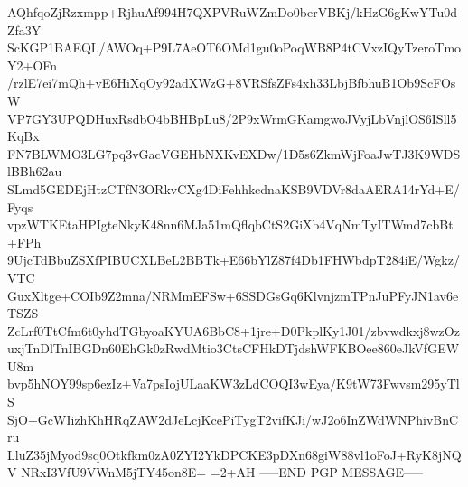 AQhfqoZjRzxmpp+RjhuAf994H7QXPVRuWZmDo0berVBKj/kHzG6gKwYTu0dZfa3Y
ScKGP1BAEQL/AWOq+P9L7AeOT6OMd1gu0oPoqWB8P4tCVxzIQyTzeroTmoY2+OFn
/rzlE7ei7mQh+vE6HiXqOy92adXWzG+8VRSfsZFs4xh33LbjBfbhuB1Ob9ScFOsW
VP7GY3UPQDHuxRsdbO4bBHBpLu8/2P9xWrmGKamgwoJVyjLbVnjlOS6ISll5KqBx
FN7BLWMO3LG7pq3vGacVGEHbNXKvEXDw/1D5s6ZkmWjFoaJwTJ3K9WDSlBBh62au
SLmd5GEDEjHtzCTfN3ORkvCXg4DiFehhkcdnaKSB9VDVr8daAERA14rYd+E/Fyqs
vpzWTKEtaHPIgteNkyK48nn6MJa51mQflqbCtS2GiXb4VqNmTyITWmd7cbBt+FPh
9UjcTdBbuZSXfPIBUCXLBeL2BBTk+E66bYlZ87f4Db1FHWbdpT284iE/Wgkz/VTC
GuxXltge+COIb9Z2mna/NRMmEFSw+6SSDGsGq6KlvnjzmTPnJuPFyJN1av6eTSZS
ZcLrf0TtCfm6t0yhdTGbyoaKYUA6BbC8+1jre+D0PkplKy1J01/zbvwdkxj8wzOz
uxjTnDlTnIBGDn60EhGk0zRwdMtio3CtsCFHkDTjdshWFKBOee860eJkVfGEWU8m
bvp5hNOY99sp6ezIz+Va7psIojULaaKW3zLdCOQI3wEya/K9tW73Fwvsm295yTlS
SjO+GcWIizhKhHRqZAW2dJeLcjKcePiTygT2vifKJi/wJ2o6InZWdWNPhivBnCru
LluZ35jMyod9sq0Otkfkm0zA0ZYI2YkDPCKE3pDXn68giW88vl1oFoJ+RyK8jNQV
NRxI3VfU9VWnM5jTY45on8E=
=2+AH
-----END PGP MESSAGE-----
